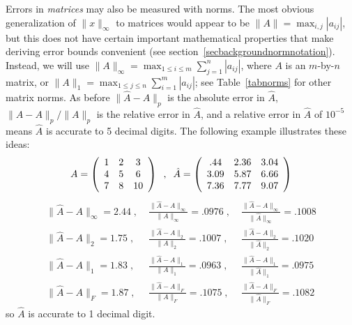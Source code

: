 Errors in {\em matrices} may also be measured with norms.
The most obvious
generalization of $\|x\|_{\infty}$ to matrices would appear to be
$\| A \| = \max_{i,j} |a_{ij}|$, but this does not have certain
important mathematical properties that make deriving error bounds
convenient (see section~\ref{secbackgroundnormnotation}).
Instead, we will use
$\| A \|_{\infty} = \max_{1 \leq i \leq m} \sum_{j=1}^n |a_{ij}|$,
where $A$ is an $m$-by-$n$ matrix, or
$\| A \|_{1} = \max_{1 \leq j \leq n} \sum_{i=1}^m |a_{ij}|$;
see Table~\ref{tabnorms} for other matrix norms.
As before $\| \hat{A} - A \|_{p}$ is the absolute
error
in $\hat{A}$, $\| \hat{A} - A \|_{p} / \| A \|_{p}$
is the relative error
in $\hat{A}$, and a relative error in $\hat{A}$ of
$10^{-5}$ means $\hat{A}$ is accurate to 5 decimal digits.
The following example illustrates these ideas:
\[
A = \bmat{ccc} 1 & 2 & 3 \\ 4 & 5 & 6 \\ 7 & 8 & 10 \emat \; \; , \; \;
\hat{A} = \bmat{ccc} .44 & 2.36 & 3.04 \\ 3.09 & 5.87 & 6.66 \\ 7.36 & 7.77 & 9.07 \emat
\]
\begin{eqnarray*}
\| \hat{A} - A \|_{\infty} = 2.44 \; , \;  & \displaystyle{
\frac{\| \hat{A} - A \|_{\infty}}{\| A \|_{\infty}} = .0976 }  \; , \;  &
\frac{\| \hat{A} - A \|_{\infty}}{\| \hat{A} \|_{\infty}} = .1008 \\
\| \hat{A} - A \|_{2} = 1.75 \; , \;  & \displaystyle{
\frac{\| \hat{A} - A \|_{2}}{\| A \|_{2}} = .1007 }  \; , \;  &
\frac{\| \hat{A} - A \|_{2}}{\| \hat{A} \|_{2}} = .1020 \\
\| \hat{A} - A \|_{1} = 1.83 \; , \;  & \displaystyle{
\frac{\| \hat{A} - A \|_{1}}{\| A \|_{1}} = .0963 }  \; , \;  &
\frac{\| \hat{A} - A \|_{1}}{\| \hat{A} \|_{1}} = .0975  \\
\| \hat{A} - A \|_{F} = 1.87 \; , \;  & \displaystyle{
\frac{\| \hat{A} - A \|_{F}}{\| A \|_{F}} = .1075 }  \; , \;  &
\frac{\| \hat{A} - A \|_{F}}{\| \hat{A} \|_{F}} = .1082
\end{eqnarray*}
so $\hat{A}$ is accurate to 1 decimal digit.

